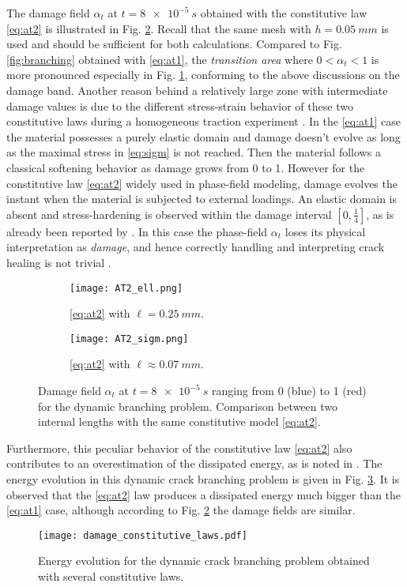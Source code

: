 The damage field $\alpha_t$ at $t=\SI{8e-5}{s}$ obtained with the constitutive law \eqref{eq:at2} is illustrated in Fig. \ref{fig:at2_ell_sigm}. Recall that the same mesh with $h=\SI{0.05}{mm}$ is used and should be sufficient for both calculations. Compared to Fig. \ref{fig:branching} obtained with \eqref{eq:at1}, the \emph{transition area} where $0<\alpha_t<1$ is more pronounced especially in Fig. \ref{fig:at2_same_ell}, conforming to the above discussions on the damage band. Another reason behind a relatively large zone with intermediate damage values is due to the different stress-strain behavior of these two constitutive laws during a homogeneous traction experiment \cite{PhamAmorMarigoMaurini:2011}. In the \eqref{eq:at1} case the material possesses a purely elastic domain and damage doesn't evolve as long as the maximal stress in \eqref{eq:sigm} is not reached. Then the material follows a classical softening behavior as damage grows from 0 to 1. However for the constitutive law \eqref{eq:at2} widely used in phase-field modeling, damage evolves the instant when the material is subjected to external loadings. An elastic domain is absent and stress-hardening is observed within the damage interval $[0,\frac{1}{4}]$, as is already been reported by \cite{BordenVerhooselScottHughesLandis:2012,SchlueterWillenbuecherKuhnMueller:2014}. In this case the phase-field $\alpha_t$ loses its physical interpretation as \emph{damage}, and hence correctly handling and interpreting crack healing is not trivial \cite{SchlueterWillenbuecherKuhnMueller:2014}.
\begin{figure}[htbp]
\centering
\begin{subfigure}[b]{0.48\textwidth}
\centering
\texttt{[image: AT2\_ell.png]}
\caption{\eqref{eq:at2} with $\ell=\SI{0.25}{mm}$.}  \label{fig:at2_same_ell}
\end{subfigure}
\begin{subfigure}[b]{0.48\textwidth}
\centering
\texttt{[image: AT2\_sigm.png]}
\caption{\eqref{eq:at2} with $\ell\approx\SI{0.07}{mm}$.}
\end{subfigure}
\caption{Damage field $\alpha_t$ at $t=\SI{8e-5}{s}$ ranging from 0 (blue) to 1 (red) for the dynamic branching problem. Comparison between two internal lengths with the same constitutive model \eqref{eq:at2}.} \label{fig:at2_ell_sigm}
\end{figure}

Furthermore, this peculiar behavior of the constitutive law \eqref{eq:at2} also contributes to an overestimation of the dissipated energy, as is noted in \cite{BordenVerhooselScottHughesLandis:2012,VignolletMayBorstVerhoosel:2014}. The energy evolution in this dynamic crack branching problem is given in Fig. \ref{fig:energy_at1_at2}. It is observed that the \eqref{eq:at2} law produces a dissipated energy much bigger than the \eqref{eq:at1} case, although according to Fig. \ref{fig:at2_ell_sigm} the damage fields are similar.
\begin{figure}[htbp]
\centering
\texttt{[image: damage\_constitutive\_laws.pdf]}
\caption{Energy evolution for the dynamic crack branching problem obtained with several constitutive laws.} \label{fig:energy_at1_at2}
\end{figure}

